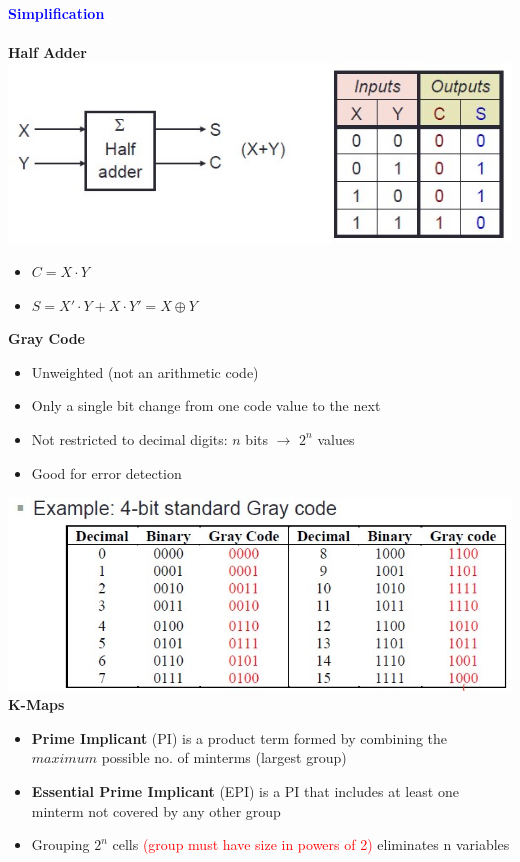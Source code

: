 \documentclass[a4paper]{article} \usepackage[backend=biber, style=numeric, sorting=none]{biblatex}
\begin{document}
\begin{multicols*}{4}
{\small\textbf{\textcolor{blue}{Simplification}}}
\\\\\textbf{Half Adder}\\
\includegraphics[scale=0.40]{Half_Adder.jpg}
\begin{itemize}
\item $C=X\cdot Y$
\item $S=X'\cdot Y+X\cdot Y' = X\oplus Y$\\
\end{itemize}
\textbf{Gray Code}
\begin{itemize}
    \item Unweighted (not an arithmetic code)
    \item Only a single bit change from one code value to the next
    \item Not restricted to decimal digits: $n$ bits $\rightarrow$ $2^n$ values
    \item Good for error detection
\end{itemize}
\includegraphics[scale=0.40]{Gray_code.jpg}\\
\textbf{K-Maps}
\begin{itemize}
\item \textbf{Prime Implicant} (PI) is a product term formed by combining the $maximum$ possible no. of minterms (largest group)
\item \textbf{Essential Prime Implicant} (EPI) is a PI that includes at least one minterm not covered by any other group
\item Grouping $2^n$ cells \textcolor{red}{(group must have size in powers of 2)} eliminates n variables

\end{itemize}
\end{multicols*}
\end{document}
